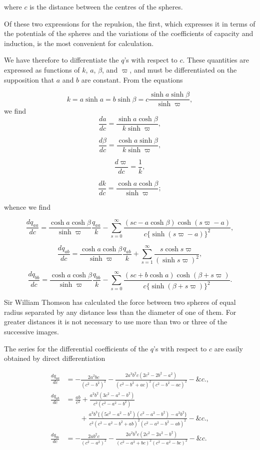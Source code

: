 \documentclass[11pt,a4paper]{article}
\begin{document}
where $c$ is the distance between the centres of the spheres.

Of these two expressions for the repulsion, the first, which expresses
it in terms of the potentials of the spheres and the variations of the
coefficients of capacity and induction, is the most convenient for
calculation.

We have therefore to differentiate the $q$'s with respect to $c$.
These quantities are expressed as functions of $k$, $a$, $\beta$, and
$\varpi$, and must be differentiated on the supposition that $a$ and
$b$ are constant. From the equations

\[
k=a\sinh a=b\sinh\beta
=c\frac{\sinh a\sinh\beta}{\sinh\varpi},
\]
we find
\[
\frac{da}{dc}=\frac{\sinh a\cosh\beta}{k\sinh\varpi},
\]

\[
\frac{d\beta}{dc}=\frac{\cosh a\sinh\beta}{k\sinh\varpi},
\]

\[
\frac{d\varpi}{dc}=\frac{1}{k},
\]

\[
\frac{dk}{dc}=\frac{\cosh a\cosh\beta}{\sinh\varpi};
\]

whence we find

\[
\frac{dq_{aa}}{dc}
=\frac{\cosh a\cosh\beta}{\sinh\varpi}\frac{q_{aa}}{k}
-\sum_{s=0}^{\infty}
\frac{(sc-a\cosh\beta)\cosh(s\varpi-a)}
{c\{\sinh(s\varpi-a)\}^2},
\]

\[
\frac{dq_{ab}}{dc}
=\frac{\cosh a\cosh\beta}{\sinh\varpi}\frac{q_{ab}}{k}
+\sum_{s=1}^{\infty}\frac{s\cosh s\varpi}{(\sinh s\varpi)^2},
\]

\[
\frac{dq_{bb}}{dc}
=\frac{\cosh a\cosh\beta}{\sinh\varpi}\frac{q_{bb}}{k}
-\sum_{s=0}^{\infty}
\frac{(sc+b\cosh a)\cosh(\beta+s\varpi)}
{c\{\sinh(\beta+s\varpi)\}^2}.
\]

Sir William Thomson has calculated the force between two spheres of
equal radius separated by any distance less than the diameter of one of
them. For greater distances it is not necessary to use more than two or
three of the successive images.

The series for the differential coefficients of the $q$'s with respect
to $c$ are easily obtained by direct differentiation

\setcounter{footnote}{0}
\[
\begin{split}
\frac{dq_{aa}}{dc}
&= -\frac{2a^2bc}{(c^2-b^2)^2}
   -\frac{2a^3b^2c(2c^2-2b^2-a^2)}
          {(c^2-b^2+ac)^2(c^2-b^2-ac)^2}
   - \&c.,\\
\frac{dq_{ab}}{dc}
&= \frac{ab}{c^2}
   +\frac{a^2b^2(3c^2-a^2-b^2)}
          {c^2(c^2-a^2-b^2)}\\
&\qquad
   +\frac{a^3b^3\{(5c^2-a^2-b^2)(c^2-a^2-b^2)-a^2b^2\}}
          {c^2(c^2-a^2-b^2+ab)^2(c^2-a^2-b^2-ab)^2}
   - \&c.,\\
\frac{dq_{bb}}{dc}
&= -\frac{2ab^2c}{(c^2-a^2)^2}
   -\frac{2a^2b^3c(2c^2-2a^2-b^2)}
          {(c^2-a^2+bc)^2(c^2-a^2-bc)^2}
   - \&c.
\end{split}
\]
\end{document}
